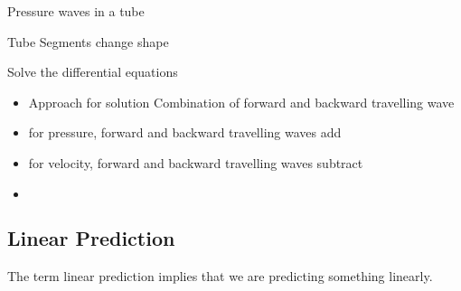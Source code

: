 \documentclass{article}
\begin{document}
Pressure waves in a tube

Tube Segments change shape

Solve the differential equations

\begin{itemize}

\item  Approach for solution
	Combination of forward and  backward travelling wave 
	
	\item for pressure, forward and backward travelling waves add
	
	\item for velocity, forward and backward travelling waves subtract
	
	\item \begin{equation} \end{equation}



\end{itemize}



\subsection{Linear Prediction}


The term linear prediction implies that we are predicting something linearly.  
\end{document}
